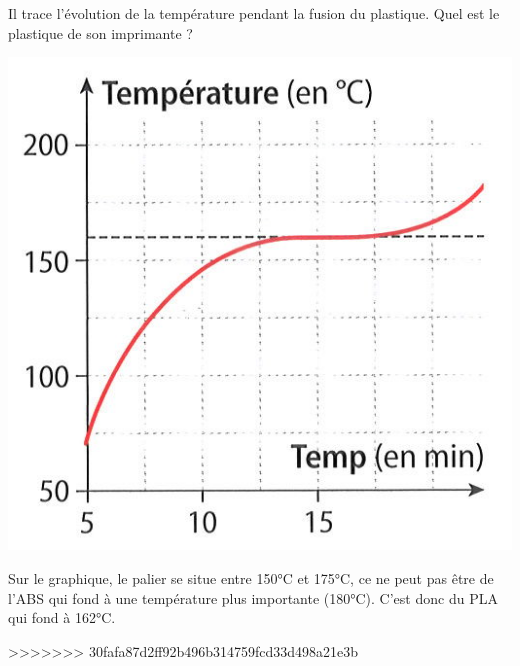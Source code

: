 \begin{questions}
	\question[2] Il trace l'évolution de la température pendant la fusion du plastique. Quel est le plastique de son imprimante ?
		\begin{center}
			\includegraphics[scale=0.45]{./img/courbe2}
		\end{center}

		\begin{solution}
			Sur le graphique, le palier se situe entre 150°C et 175°C, ce ne peut pas être de l'ABS qui fond à une température plus importante (180°C). C'est donc du PLA qui fond à 162°C.
		\end{solution}	

>>>>>>> 30fafa87d2ff92b496b314759fcd33d498a21e3b
\end{questions}